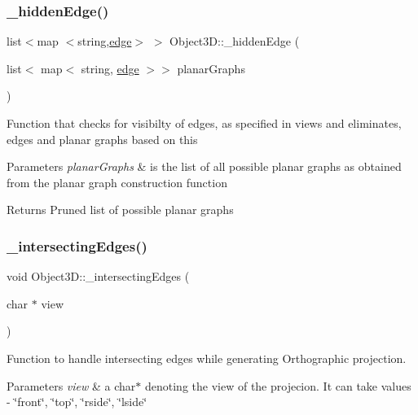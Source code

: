 \subsubsection{\texorpdfstring{\+\_\+hidden\+Edge()}{\_hiddenEdge()}}
{\footnotesize\ttfamily list$<$map $<$string,\mbox{\hyperlink{structedge}{edge}}$>$ $>$ Object3\+D\+::\+\_\+hidden\+Edge (\begin{DoxyParamCaption}\item[{list$<$ map$<$ string, \mbox{\hyperlink{structedge}{edge}} $>$$>$}]{planar\+Graphs }\end{DoxyParamCaption})\hspace{0.3cm}{\ttfamily [protected]}}

Function that checks for visibilty of edges, as specified in views and eliminates, edges and planar graphs based on this 
\begin{DoxyParams}{Parameters}
{\em planar\+Graphs} & is the list of all possible planar graphs as obtained from the planar graph construction function \\
\hline
\end{DoxyParams}
\begin{DoxyReturn}{Returns}
Pruned list of possible planar graphs 
\end{DoxyReturn}
\mbox{\label{class_object3_d_a41783dfe045485d27c8f9027b004a221}} 
\subsubsection{\texorpdfstring{\+\_\+intersecting\+Edges()}{\_intersectingEdges()}}
{\footnotesize\ttfamily void Object3\+D\+::\+\_\+intersecting\+Edges (\begin{DoxyParamCaption}\item[{char $\ast$}]{view }\end{DoxyParamCaption})\hspace{0.3cm}{\ttfamily [protected]}}

Function to handle intersecting edges while generating Orthographic projection. 
\begin{DoxyParams}{Parameters}
{\em view} & a char$\ast$ denoting the view of the projecion. It can take values -\/ \char`\"{}front\char`\"{}, \char`\"{}top\char`\"{}, \char`\"{}rside\char`\"{}, \char`\"{}lside\char`\"{} \\
\hline
\end{DoxyParams}
\mbox{\label{class_object3_d_a017b95a379f6aa10983f34a0805d851f}} 
